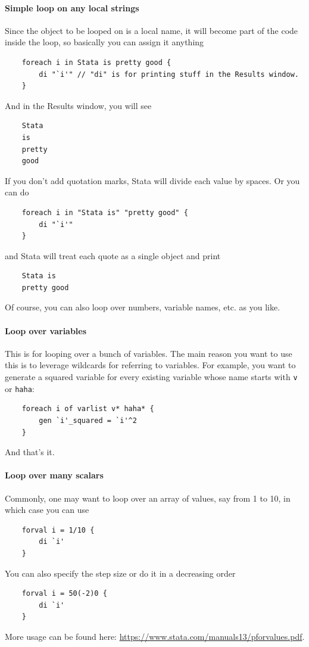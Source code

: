 \paragraph{Simple loop on any local strings}
Since the object to be looped on is a local name, it will become part of the code inside the loop, so basically you can assign it anything
\begin{verbatim}
    foreach i in Stata is pretty good {
        di "`i'" // "di" is for printing stuff in the Results window.
    }
\end{verbatim}
And in the Results window, you will see
\begin{verbatim}
    Stata
    is 
    pretty 
    good
\end{verbatim}
If you don't add quotation marks, Stata will divide each value by spaces. Or you can do 
\begin{verbatim}
    foreach i in "Stata is" "pretty good" {
        di "`i'" 
    }
\end{verbatim}
and Stata will treat each quote as a single object and print
\begin{verbatim}
    Stata is 
    pretty good
\end{verbatim}
Of course, you can also loop over numbers, variable names, etc. as you like.

\paragraph{Loop over variables}
This is for looping over a bunch of variables. The main reason you want to use this is to leverage wildcards for referring to variables. For example, you want to generate a squared variable for every existing variable whose name starts with \verb|v| or \verb|haha|:
\begin{verbatim}
    foreach i of varlist v* haha* {
        gen `i'_squared = `i'^2
    }
\end{verbatim}
And that's it. 

\paragraph{Loop over many scalars}
Commonly, one may want to loop over an array of values, say from 1 to 10, in which case you can use 
\begin{verbatim}
    forval i = 1/10 {
        di `i'
    }
\end{verbatim}
You can also specify the step size or do it in a decreasing order
\begin{verbatim}
    forval i = 50(-2)0 {
        di `i'
    }
\end{verbatim}
More usage can be found here: \url{https://www.stata.com/manuals13/pforvalues.pdf}.

